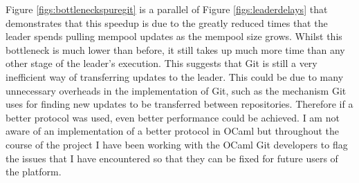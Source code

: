 \documentclass[12pt,a4paper,twoside,openright]{report}
\begin{document}
	Figure \ref{figs:bottleneckspuregit} is a parallel of Figure \ref{figs:leaderdelays} that demonstrates that this speedup is due to the greatly reduced times that the leader spends pulling mempool updates as the mempool size grows.
	Whilst this bottleneck is much lower than before, it still takes up much more time than any other stage of the leader's execution.
	This suggests that Git is still a very inefficient way of transferring updates to the leader.  
	This could be due to many unnecessary overheads in the implementation of Git, such as the mechanism Git uses for finding new updates to be transferred between repositories. 
	Therefore if a better protocol was used, even better performance could be achieved.
	I am not aware of an implementation of a better protocol in OCaml but throughout the course of the project I have been working with the OCaml Git developers to flag the issues that I have encountered so that they can be fixed for future users of the platform.\\
\end{document}
